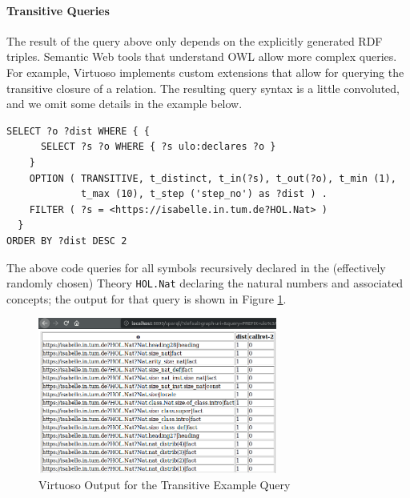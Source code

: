 
\paragraph{Transitive Queries} The result of the query above only depends on the explicitly generated RDF triples. Semantic Web tools that understand OWL allow more complex queries. %
For example, Virtuoso implements custom extensions that allow for querying the transitive closure of a relation. The resulting query syntax is a little convoluted, and we omit some details in the example below.
\begin{lstlisting}
SELECT ?o ?dist WHERE { {
      SELECT ?s ?o WHERE { ?s ulo:declares ?o }
    }
    OPTION ( TRANSITIVE, t_distinct, t_in(?s), t_out(?o), t_min (1),
             t_max (10), t_step ('step_no') as ?dist ) .
    FILTER ( ?s = <https://isabelle.in.tum.de?HOL.Nat> )
  }
ORDER BY ?dist DESC 2
\end{lstlisting}
The above code queries for all symbols recursively declared in the (effectively randomly chosen) Theory \texttt{HOL.Nat} declaring the natural numbers and associated concepts; the output for that query is shown in Figure \ref{fig:query2}.


\begin{figure}[ht]\centering
\includegraphics[width=0.7\textwidth]{ulo_queryresult2}
\caption{Virtuoso Output for the Transitive Example Query}\label{fig:query2}
\end{figure}

